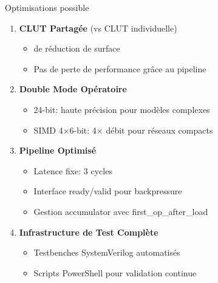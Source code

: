 \documentclass[aspectratio=169]{beamer}
\begin{document}
\begin{frame}{Optimisations possible}
\begin{enumerate}
\item \textbf{CLUT Partagée} (vs CLUT individuelle)
   \begin{itemize}
   \item de réduction de surface
   \item Pas de perte de performance grâce au pipeline
   \end{itemize}

\item \textbf{Double Mode Opératoire}
   \begin{itemize}
   \item 24-bit: haute précision pour modèles complexes
   \item SIMD 4×6-bit: 4× débit pour réseaux compacts
   \end{itemize}

\item \textbf{Pipeline Optimisé}
   \begin{itemize}
   \item Latence fixe: 3 cycles
   \item Interface ready/valid pour backpressure
   \item Gestion accumulator avec first\_op\_after\_load
   \end{itemize}

\item \textbf{Infrastructure de Test Complète}
   \begin{itemize}
   \item Testbenches SystemVerilog automatisés
   \item Scripts PowerShell pour validation continue
   \end{itemize}
\end{enumerate}
\end{frame}
\end{document}
